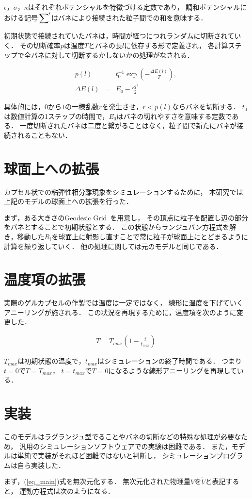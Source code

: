 $\epsilon$，$\sigma$，$\kappa$はそれぞれポテンシャルを特徴づける定数であり，
調和ポテンシャルにおける記号$\sideset{}{'}\sum$はバネにより接続された粒子間での和を意味する．

初期状態で接続されていたバネは，時間が経つにつれランダムに切断されていく．
その切断確率$p$は温度$T$とバネの長$l$に依存する形で定義され，
各計算ステップで全バネに対して切断するかしないかの処理がなされる．

\begin{eqnarray}
p(l)
&=&
t_0^{-1}
\exp\left(-\frac{\Delta E(l)}{T}\right)
,\\
\Delta E(l)
&=&
E_0-\frac{\kappa l^2}{2}
\end{eqnarray}

具体的には，$0$から$1$の一様乱数$r$を発生させ，$r<p(l)$ならバネを切断する．
$t_0$は数値計算の1ステップの時間で，$E_0$はバネの切れやすさを意味する定数である．
一度切断されたバネは二度と繋がることはなく，粒子間で新たにバネが接続されることもない．

\section{球面上への拡張}
カプセル状での粘弾性相分離現象をシミュレーションするために，
本研究では上記のモデルの球面上への拡張を行った．

まず，ある大きさのGeodesic Grid~\cite{Geodesic}を用意し，
その頂点に粒子を配置し辺の部分をバネとすることで初期状態とする．
この状態からランジュバン方程式を解き，移動した$R_i$を球面上に射影し直すことで常に粒子が球面上にとどまるように計算を繰り返していく．
他の処理に関しては元のモデルと同じである．



\section{温度項の拡張}
実際のゲルカプセルの作製では温度は一定ではなく，
線形に温度を下げていくアニーリングが施される．
この状況を再現するために，温度項を次のように変更した．

\begin{eqnarray}
T = T_{max}(1-\frac{t}{t_{max}})
\end{eqnarray}

$T_{max}$は初期状態の温度で，$t_{max}$はシミュレーションの終了時間である．
つまり$t=0$で$T=T_{max}$，
$t=t_{max}$で$T=0$になるような線形アニーリングを再現している．


\section{実装}
このモデルはラグランジュ型でることやバネの切断などの特殊な処理が必要なため，
汎用のシミュレーションソフトウェアでの実験は困難である．
また，モデルは単純で実装がそれほど困難ではないと判断し，
シミュレーションプログラムは自ら実装した．

まず，(\ref{eq_main})式を無次元化する．
無次元化された物理量$V$を$\tilde{V}$と表記すると，
運動方程式は次のようになる．

